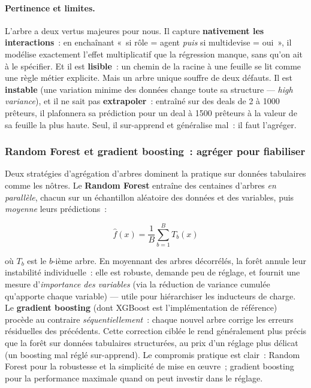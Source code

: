 \paragraph{Pertinence et limites.}
L'arbre a deux vertus majeures pour nous. Il capture \textbf{nativement les
interactions}~: en enchaînant «~si rôle = agent \emph{puis} si multidevise = oui~», il
modélise exactement l'effet multiplicatif que la régression manque, sans qu'on ait à le
spécifier. Et il est \textbf{lisible}~: un chemin de la racine à une feuille se lit comme
une règle métier explicite. Mais un arbre unique souffre de deux défauts. Il est
\textbf{instable} (une variation minime des données change toute sa structure ---
\emph{high variance}), et il ne sait pas \textbf{extrapoler}~: entraîné sur des deals de
2 à 1000 prêteurs, il plafonnera sa prédiction pour un deal à 1500 prêteurs à la valeur
de sa feuille la plus haute. Seul, il sur-apprend et généralise mal~: il faut l'agréger.

\subsubsection{Random Forest et gradient boosting~: agréger pour fiabiliser}

Deux stratégies d'agrégation d'arbres dominent la pratique sur données tabulaires comme
les nôtres. Le \textbf{Random Forest} entraîne des centaines d'arbres \emph{en parallèle},
chacun sur un échantillon aléatoire des données et des variables, puis \emph{moyenne}
leurs prédictions~:

\begin{equation}
\hat{f}(x) = \frac{1}{B}\sum_{b=1}^{B} T_b(x)
\label{eq:random-forest}
\end{equation}

\noindent où $T_b$ est le $b$-ième arbre. En moyennant des arbres décorrélés, la forêt
annule leur instabilité individuelle~: elle est robuste, demande peu de réglage, et
fournit une mesure d'\emph{importance des variables} (via la réduction de variance
cumulée qu'apporte chaque variable) --- utile pour hiérarchiser les inducteurs de charge.
Le \textbf{gradient boosting} (dont XGBoost est l'implémentation de référence) procède au
contraire \emph{séquentiellement}~: chaque nouvel arbre corrige les erreurs résiduelles
des précédents. Cette correction ciblée le rend généralement plus précis que la forêt sur
données tabulaires structurées, au prix d'un réglage plus délicat (un boosting mal réglé
sur-apprend). Le compromis pratique est clair~: Random Forest pour la robustesse et la
simplicité de mise en œuvre~; gradient boosting pour la performance maximale quand on
peut investir dans le réglage.

